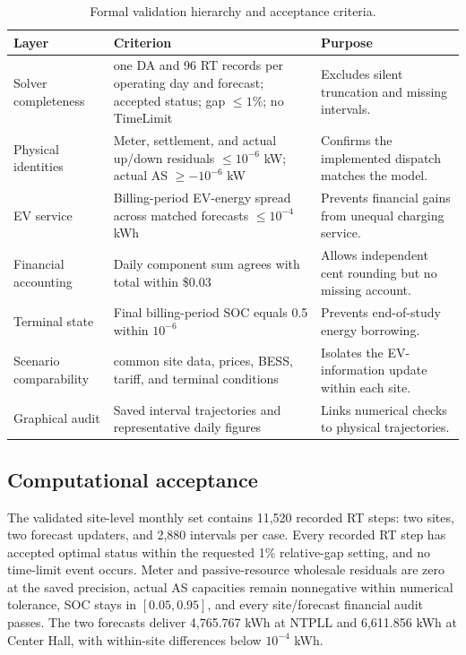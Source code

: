 \documentclass[final,5p,times]{elsarticle}
\begin{document}
\begin{table}[!t]
\centering
\caption{Formal validation hierarchy and acceptance criteria.}
\label{tab:validation_protocol}
\scriptsize
\begin{tabularx}{\textwidth}{@{}p{}p{}X@{}}
\toprule
Layer & Criterion & Purpose \\
\midrule
Solver completeness & one DA and 96 RT records per operating day and forecast; accepted status; gap $\le1\%$; no TimeLimit & Excludes silent truncation and missing intervals.\\
Physical identities & Meter, settlement, and actual up/down residuals $\le10^{-6}$ kW; actual AS $\ge-10^{-6}$ kW & Confirms the implemented dispatch matches the model.\\
EV service & Billing-period EV-energy spread across matched forecasts $\le10^{-4}$ kWh & Prevents financial gains from unequal charging service.\\
Financial accounting & Daily component sum agrees with total within \$0.03 & Allows independent cent rounding but no missing account.\\
Terminal state & Final billing-period SOC equals 0.5 within $10^{-6}$ & Prevents end-of-study energy borrowing.\\
Scenario comparability & common site data, prices, BESS, tariff, and terminal conditions & Isolates the EV-information update within each site.\\
Graphical audit & Saved interval trajectories and representative daily figures & Links numerical checks to physical trajectories.\\
\bottomrule
\end{tabularx}
\end{table}

\subsection{Computational acceptance}
The validated site-level monthly set contains 11,520 recorded RT steps: two sites, two forecast updaters, and 2,880 intervals per case. Every recorded RT step has accepted optimal status within the requested 1\% relative-gap setting, and no time-limit event occurs. Meter and passive-resource wholesale residuals are zero at the saved precision, actual AS capacities remain nonnegative within numerical tolerance, SOC stays in $[0.05,0.95]$, and every site/forecast financial audit passes. The two forecasts deliver 4,765.767 kWh at NTPLL and 6,611.856 kWh at Center Hall, with within-site differences below $10^{-4}$ kWh.
\end{document}
